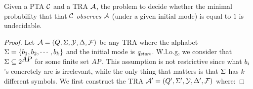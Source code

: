 %
\begin{theorem}\label{thm:traundecidability}
Given a PTA $\mathcal{C}$ and a TRA $\mathcal{A}$, the problem to decide whether the minimal probability that
that $\mathcal{C}$ \emph{observes} $\mathcal{A}$ (under a given initial mode) is equal to $1$ is undecidable.
\end{theorem}
%
\begin{proof}
Let $\mathcal{A}=(Q,\Sigma,\mathcal{Y},\Delta,\mathcal{F})$ be any TRA where the alphabet $\Sigma = \{b_{1}, b_{2}, \cdots, b_{k}\}$ and the initial mode is $q_{\mbox{\sl\scriptsize start}}$.
W.l.o.g, we consider that $\Sigma\subseteq 2^{\mbox{\sl AP}}$ for some finite set $\mbox{\sl AP}$.
This assumption is not restrictive since what $b_{i}$'s concretely are is irrelevant, while the only thing that matters is that $\Sigma$ has $k$ different symbols.
We first construct the TRA $\mathcal{A}' = (Q', \Sigma', \mathcal{Y}, \Delta',\mathcal{F})$ where:


\end{proof}
